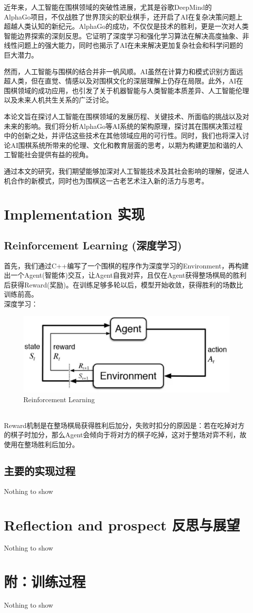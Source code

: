 \documentclass[a4paper]{article}
\begin{document}
	近年来，人工智能在围棋领域的突破性进展，尤其是谷歌DeepMind的\\AlphaGo项目，不仅战胜了世界顶尖的职业棋手，还开启了AI在复杂决策问题上超越人类认知的新纪元。AlphaGo的成功，不仅仅是技术的胜利，更是一次对人类智能边界探索的深刻反思。它证明了深度学习和强化学习算法在解决高度抽象、非线性问题上的强大能力，同时也揭示了AI在未来解决更加复杂社会和科学问题的巨大潜力。
	
	然而，人工智能与围棋的结合并非一帆风顺。AI虽然在计算力和模式识别方面远超人类，但在直觉、情感以及对围棋文化的深层理解上仍存在局限。此外，AI在围棋领域的成功应用，也引发了关于机器智能与人类智能本质差异、人工智能伦理以及未来人机共生关系的广泛讨论。
	
	本论文旨在探讨人工智能在围棋领域的发展历程、关键技术、所面临的挑战以及对未来的影响。我们将分析AlphaGo等AI系统的架构原理，探讨其在围棋决策过程中的创新之处，并评估这些技术在其他领域应用的可行性。同时，我们也将深入讨论AI围棋系统所带来的伦理、文化和教育层面的思考，以期为构建更加和谐的人工智能社会提供有益的视角。
	
	通过本文的研究，我们期望能够加深对人工智能技术及其社会影响的理解，促进人机合作的新模式，同时也为围棋这一古老艺术注入新的活力与思考。
	
	\section{Implementation  实现}
	\subsection{Reinforcement Learning  (深度学习)}
	首先，我们通过C++编写了一个围棋的程序作为深度学习的Environment，再构建出一个Agent(智能体)交互，让Agent自我对弈，且仅在Agent获得整场棋局的胜利后获得Reward(奖励)。在训练足够多轮以后，模型开始收敛，获得胜利的场数比训练前高。\\
	深度学习：
	\begin{figure}[htbp]
		\centering
		\includegraphics[scale=0.2]{RL.eps}
		\caption{Reinforcement Learning}
		\label{figure}
	\end{figure}\\
	Reward机制是在整场棋局获得胜利后加分，失败时扣分的原因是：若在吃掉对方的棋子时加分，那么Agent会倾向于将对方的棋子吃掉，这对于整场对弈不利，故使用在整场胜利后加分。
	\subsection{主要的实现过程}
	Nothing to show
	
	
	\section{Reflection and prospect 反思与展望}
	Nothing to show
	
	\section{附：训练过程}
	Nothing to show
\end{document}
